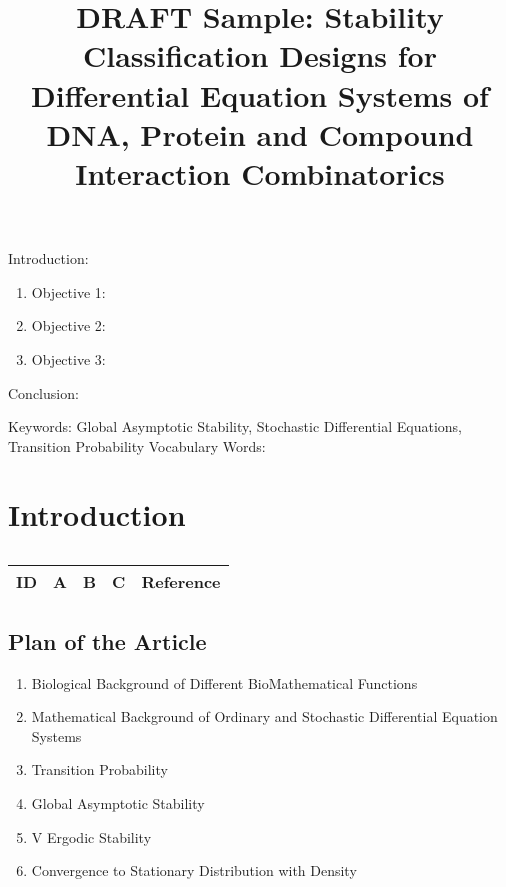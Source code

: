 

\twocolumn
\scriptsize
\begin{frontmatter}
		\title{DRAFT Sample: Stability Classification Designs for Differential Equation Systems of DNA, Protein and Compound Interaction Combinatorics}
		\author{}
		\address{The Mathematical Learning Space}
\end{frontmatter}	

Introduction:
\begin{enumerate}
\item Objective 1:
\item Objective 2:
\item Objective 3:
\end{enumerate}
Conclusion:

Keywords: Global Asymptotic Stability, Stochastic Differential Equations, Transition Probability
Vocabulary Words:

\section{Introduction}

\centering
\begin{table}[H]\footnotesize
	\caption{}
	\begin{tabular}{rp{1cm}p{2cm}p{3cm}p{1cm}}
		\hline
		ID & A & B & C & Reference \\
		\hline
		\hline
	\end{tabular}
\end{table}
\raggedright


\subsection{Plan of the Article}

\begin{enumerate}
\item Biological Background of Different BioMathematical Functions
\item Mathematical Background of Ordinary and Stochastic Differential Equation Systems
\item Transition Probability
\item Global Asymptotic Stability
\item V Ergodic Stability
\item Convergence to Stationary Distribution with Density
\end{enumerate}


